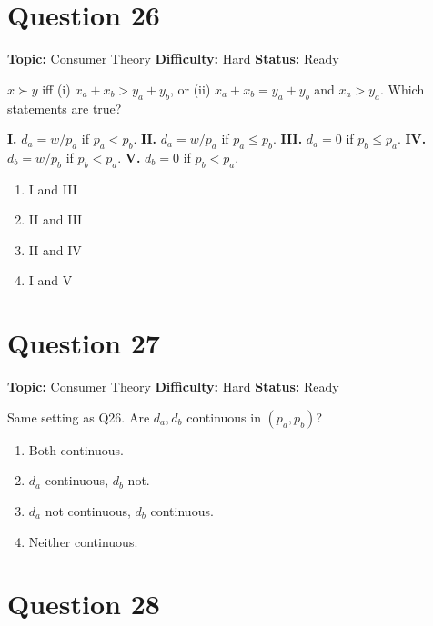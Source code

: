 \documentclass[11pt]{article}
\begin{document}
\newpage

\section*{Question 26}


\noindent\textbf{Topic:} Consumer Theory \quad \textbf{Difficulty:} Hard \quad \textbf{Status:} Ready



$x \succ y$ iff (i) $x_a + x_b > y_a + y_b$, or (ii) $x_a + x_b = y_a + y_b$ and $x_a > y_a$. Which statements are true?

\textbf{I.} $d_a = w/p_a$ if $p_a < p_b$. \quad
\textbf{II.} $d_a = w/p_a$ if $p_a \le p_b$. \quad
\textbf{III.} $d_a = 0$ if $p_b \le p_a$. \quad
\textbf{IV.} $d_b = w/p_b$ if $p_b < p_a$. \quad
\textbf{V.} $d_b = 0$ if $p_b < p_a$.

\begin{enumerate}[label=(\Alph*)]
\item I and III \item II and III \item II and IV \item I and V
\end{enumerate}

\newpage

\section*{Question 27}


\noindent\textbf{Topic:} Consumer Theory \quad \textbf{Difficulty:} Hard \quad \textbf{Status:} Ready



Same setting as Q26. Are $d_a, d_b$ continuous in $(p_a, p_b)$?
\begin{enumerate}[label=(\Alph*)]
\item Both continuous.
\item $d_a$ continuous, $d_b$ not.
\item $d_a$ not continuous, $d_b$ continuous.
\item Neither continuous.
\end{enumerate}

\newpage

\section*{Question 28}
\end{document}
